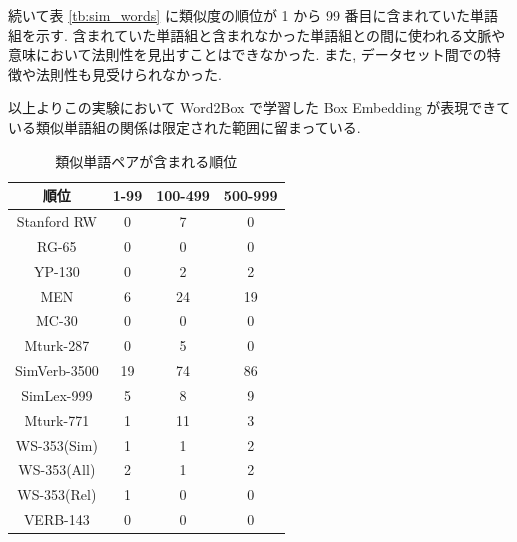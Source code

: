 \documentclass[twocolumn]{jarticle}     %
\begin{document}
続いて表 \ref{tb:sim_words} に類似度の順位が 1 から 99 番目に含まれていた単語組を示す. 
含まれていた単語組と含まれなかった単語組との間に使われる文脈や意味において法則性を見出すことはできなかった. 
また, データセット間での特徴や法則性も見受けられなかった. 

以上よりこの実験において Word2Box で学習した Box Embedding が表現できている類似単語組の関係は限定された範囲に留まっている. 

\begin{table}[t]
  \caption{類似単語ペアが含まれる順位}
  \label{tb:result}
  \begin{tabular}{c|ccc}
    \hline
    順位           & 1-99 & 100-499 & 500-999 \\ \hline \hline
    Stanford RW  & 0    & 7       & 0       \\
    RG-65        & 0    & 0       & 0       \\
    YP-130       & 0    & 2       & 2       \\
    MEN          & 6    & 24      & 19      \\
    MC-30        & 0    & 0       & 0       \\
    Mturk-287    & 0    & 5       & 0       \\
    SimVerb-3500 & 19   & 74      & 86      \\
    SimLex-999   & 5    & 8       & 9       \\
    Mturk-771    & 1    & 11      & 3       \\
    WS-353(Sim)  & 1    & 1       & 2       \\
    WS-353(All)  & 2    & 1       & 2       \\
    WS-353(Rel)  & 1    & 0       & 0       \\
    VERB-143     & 0    & 0       & 0       \\ \hline
  \end{tabular}
\end{table}
\end{document}
